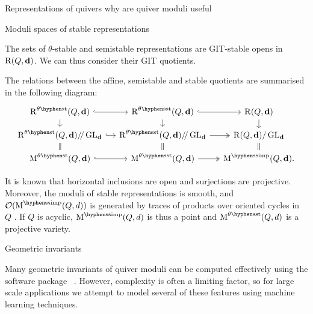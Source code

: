 \documentclass[final,20pt]{beamer}
\newcommand{\todo}[1]{{\color{blue}#1}}
\newlength{\colwidth}
\begin{document}
\begin{frame}[t]
\begin{columns}[t]
\begin{column}{\colwidth}
\begin{block}{Representations of quivers}
    \todo{why are quiver moduli useful}
    \end{block}

  \begin{block}{Moduli spaces of stable representations}

    The sets of $\theta$-stable and semistable representations
    are GIT-stable opens in $\operatorname{R}(Q, \mathbf{d})$.
    We can thus consider their GIT quotients.

    The relations between the affine, semistable and stable quotients are summarised in the following diagram:
    \begin{equation}
      \begin{tikzcd}[row sep=small, column sep=small, ampersand replacement=\&]
        \repspace^{\theta\stable}(Q, \tuple{d}) \arrow[r,hook] \arrow[d]     \& \repspace^{\theta\semistable}(Q, \tuple{d}) \arrow[r,hook] \arrow[d]     \& \repspace(Q, \tuple{d}) \arrow[d] \\
        \repspace^{\theta\stable}(Q, \tuple{d})\gitquot\GLd \arrow[r, hook] \arrow[d, equal] \& \repspace^{\theta\semistable}(Q, \tuple{d})\gitquot\GLd \arrow[r, two heads] \arrow[d, equal] \& \repspace(Q, \tuple{d}) / \GLd \arrow[d, equal] \\
        \modulispace^{\theta\stable}(Q, \tuple{d}) \arrow[r, hook]          \& \modulispace^{\theta\semistable}(Q, \tuple{d}) \arrow[r, two heads]                \& \modulispace^{\semisimple}(Q, \tuple{d}).
      \end{tikzcd}
    \end{equation}

    It is known that horizontal inclusions are open and surjections are projective.
    Moreover, the moduli of stable representations is smooth, and
    $\mathcal{O}(\modulispace^{\semisimple}(Q, d))$ is generated by traces of products over
    oriented cycles in $Q$ \cite{MR958897}.
    If $Q$ is acyclic, $\modulispace^{\semisimple}(Q, d)$ is thus a point
    and $\modulispace^{\theta\semistable}(Q, d)$ is a projective variety.
    \vfill
  \end{block}

  \begin{alertblock}{Geometric invariants}

    Many geometric invariants of quiver moduli can be computed effectively
    using the software package \quivertools~\cite{quivertools,2506.19432}.
    However, complexity is often a limiting factor,
    so for large scale applications we attempt to model
    several of these features using machine learning techniques.


\end{alertblock}
\end{column}
\end{columns}
\end{frame}
\end{document}
